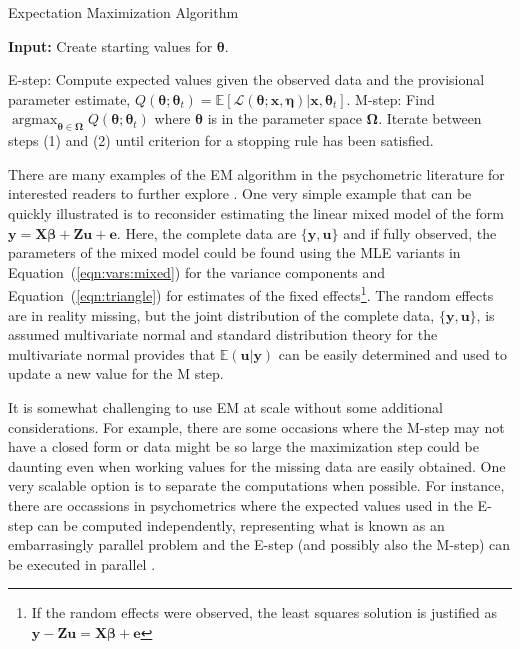 \documentclass[12pt]{article}
\DeclareMathOperator*{\argmax}{argmax}
\begin{document}
\begin{algorithm}
\caption{Expectation Maximization Algorithm}
\label{algo:em}
	\hspace*{\algorithmicindent} \textbf{Input:} Create starting values for $\bm{\theta}$.
\begin{algorithmic}[1]
	\State E-step: Compute expected values given the observed data and the provisional parameter estimate, $Q(\bm{\theta};\bm{\theta}_t) = \mathbb{E}[\mathcal{L}(\bm{\theta};\bm{x},\bm{\eta})|\bm{x},\bm{\theta}_t]$.
	\State M-step: Find $\argmax_{\bm{\theta} \in \bm{\Omega}} Q(\bm{\theta};\bm{\theta}_t)$ where $\bm{\theta}$ is in the parameter space $\bm{\Omega}$.
	\State Iterate between steps (1) and (2) until criterion for a stopping rule has been satisfied. 
\end{algorithmic}
\end{algorithm}

There are many examples of the EM algorithm in the psychometric literature for interested readers to further explore \cite{Hsu1999TheRB}. One very simple example that can be quickly illustrated is to reconsider estimating the linear mixed model of the form $\bm{y} = \bm{X}\bm{\beta} + \bm{Z}\bm{u} + \bm{e}$. Here, the complete data are $\{\bm{y}, \bm{u}\}$ and if fully observed, the parameters of the mixed model could be found using the MLE variants in Equation~(\ref{eqn:vars:mixed}) for the variance components and Equation~(\ref{eqn:triangle}) for estimates of the fixed effects\footnote{If the random effects were observed, the least squares solution is justified as $\bm{y} -\bm{Z}\bm{u} = \bm{X}\bm{\beta} + \bm{e}$}. The random effects are in reality missing, but the joint distribution of the complete data, $\{\bm{y}, \bm{u}\}$, is assumed multivariate normal and standard distribution theory for the multivariate normal provides that $\mathbb{E}(\bm{u}|\bm{y})$ can be easily determined \cite{mcandsearle:2001} and used to update a new value for the M step.  

It is somewhat challenging to use EM at scale without some additional considerations. For example, there are some occasions where the M-step may not have a closed form or data might be so large the maximization step could be daunting even when working values for the missing data are easily obtained. One very scalable option is to separate the computations when possible. For instance, there are occassions in psychometrics where the expected values used in the E-step can be computed independently, representing what is known as an embarrasingly parallel problem and the E-step (and possibly also the M-step) can be executed in parallel \cite{lee}. 
\end{document}
